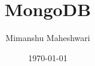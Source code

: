 \documentclass{report}
\title{\textbf{MongoDB}}
\author{Mimanshu Maheshwari}
\date{\today}
\begin{document}
\maketitle
\tableofcontents
\listoffigures
\lstlistoflistings






\printglossaries
\end{document}
